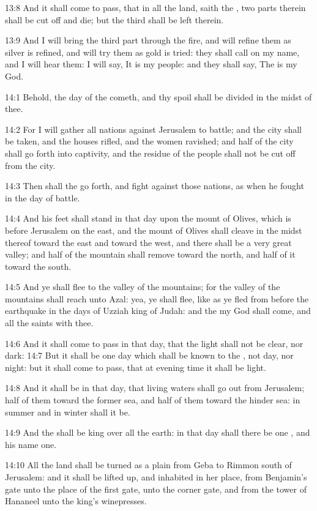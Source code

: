 13:8 And it shall come to pass, that in all the land, saith the \LORD,
two parts therein shall be cut off and die; but the third shall be
left therein.

13:9 And I will bring the third part through the fire, and will refine
them as silver is refined, and will try them as gold is tried: they
shall call on my name, and I will hear them: I will say, It is my
people: and they shall say, The \LORD is my God.

14:1 Behold, the day of the \LORD cometh, and thy spoil shall be
divided in the midst of thee.

14:2 For I will gather all nations against Jerusalem to battle; and
the city shall be taken, and the houses rifled, and the women
ravished; and half of the city shall go forth into captivity, and the
residue of the people shall not be cut off from the city.

14:3 Then shall the \LORD go forth, and fight against those nations, as
when he fought in the day of battle.

14:4 And his feet shall stand in that day upon the mount of Olives,
which is before Jerusalem on the east, and the mount of Olives shall
cleave in the midst thereof toward the east and toward the west, and
there shall be a very great valley; and half of the mountain shall
remove toward the north, and half of it toward the south.

14:5 And ye shall flee to the valley of the mountains; for the valley
of the mountains shall reach unto Azal: yea, ye shall flee, like as ye
fled from before the earthquake in the days of Uzziah king of Judah:
and the \LORD my God shall come, and all the saints with thee.

14:6 And it shall come to pass in that day, that the light shall not
be clear, nor dark: 14:7 But it shall be one day which shall be known
to the \LORD, not day, nor night: but it shall come to pass, that at
evening time it shall be light.

14:8 And it shall be in that day, that living waters shall go out from
Jerusalem; half of them toward the former sea, and half of them toward
the hinder sea: in summer and in winter shall it be.

14:9 And the \LORD shall be king over all the earth: in that day shall
there be one \LORD, and his name one.

14:10 All the land shall be turned as a plain from Geba to Rimmon
south of Jerusalem: and it shall be lifted up, and inhabited in her
place, from Benjamin's gate unto the place of the first gate, unto the
corner gate, and from the tower of Hananeel unto the king's
winepresses.

